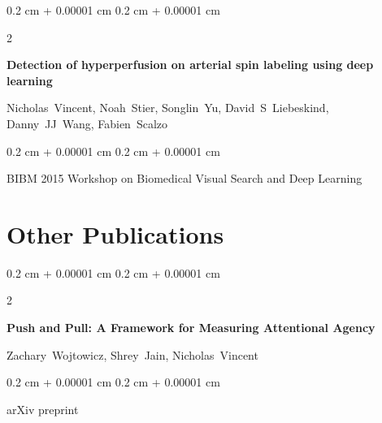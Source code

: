 \documentclass[10pt, letterpaper]{article}
\newenvironment{onecolentry}{
    \begin{adjustwidth}{
        0.2 cm + 0.00001 cm
    }{
        0.2 cm + 0.00001 cm
    }
}{
    \end{adjustwidth}
} %
\newenvironment{twocolentry}[2][]{
    \onecolentry
    \def\secondColumn{#2}
    \setcolumnwidth{\fill, 4.1 cm}
    \begin{paracol}{2}
}{
    \switchcolumn \raggedleft \secondColumn
    \end{paracol}
    \endonecolentry
} %
\begin{document}
        \vspace{0.2 cm}

        \begin{samepage}
            \begin{twocolentry}{
                2015
            }
                \textbf{Detection of hyperperfusion on arterial spin labeling using deep learning}

                \vspace{0.10 cm}

                \mbox{Nicholas Vincent}, \mbox{Noah Stier}, \mbox{Songlin Yu}, \mbox{David S Liebeskind}, \mbox{Danny JJ Wang}, \mbox{Fabien Scalzo}
            \end{twocolentry}


            \vspace{0.10 cm}

            \begin{onecolentry}
        BIBM 2015 Workshop on Biomedical Visual Search and Deep Learning    \end{onecolentry}
        \end{samepage}


    
    \section{Other Publications}



        
        \begin{samepage}
            \begin{twocolentry}{
                2024
            }
                \textbf{Push and Pull: A Framework for Measuring Attentional Agency}

                \vspace{0.10 cm}

                \mbox{Zachary Wojtowicz}, \mbox{Shrey Jain}, \mbox{Nicholas Vincent}
            \end{twocolentry}


            \vspace{0.10 cm}

            \begin{onecolentry}
        arXiv preprint    \end{onecolentry}
        \end{samepage}

        \vspace{0.2 cm}
\end{document}
